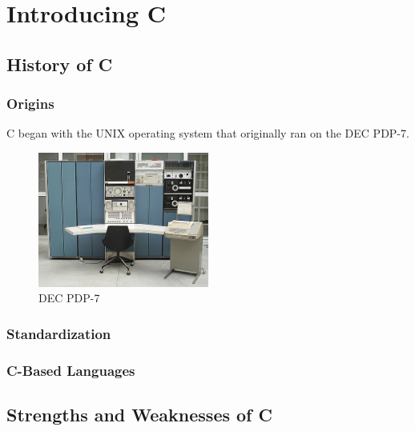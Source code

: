 \chapter[Introducing C]{Introducing C}


\section[history of C]{History of C}

\subsection*{Origins} 

C began with the UNIX operating system that originally ran on the DEC PDP-7.

\begin{figure}[h!]
  \caption{DEC PDP-7}
  \centering
  \includegraphics[width=0.5\textwidth]{images/pdp7.jpeg}
\end{figure}

\subsection*{Standardization}

\subsection*{C-Based Languages} 

\section[strengths/weaknesses]{Strengths and Weaknesses of C}